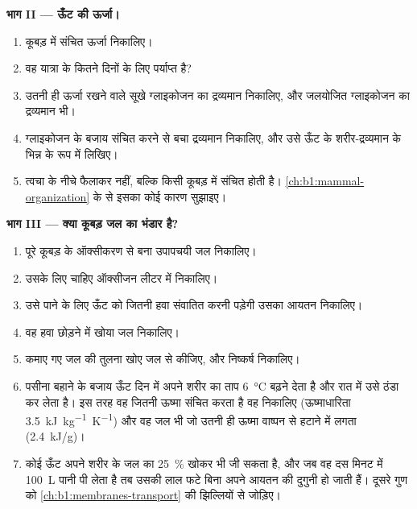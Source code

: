 \begin{problem}
\medskip
\noindent\textbf{भाग II --- ऊँट की ऊर्जा।}
\begin{enumerate}[resume]
  \item कूबड़ में संचित ऊर्जा निकालिए।
  \item वह यात्रा के कितने दिनों के लिए पर्याप्त है?
  \item उतनी ही ऊर्जा रखने वाले सूखे ग्लाइकोजन का द्रव्यमान निकालिए,
        और जलयोजित ग्लाइकोजन का द्रव्यमान भी।
  \item ग्लाइकोजन के बजाय  संचित करने से बचा द्रव्यमान निकालिए, और
        उसे ऊँट के शरीर-द्रव्यमान के भिन्न के रूप में लिखिए।
  \item {} त्वचा के नीचे फैलाकर नहीं, बल्कि किसी कूबड़ में संचित होती
        है। \cref{ch:b1:mammal-organization} के  से इसका कोई
        कारण सुझाइए।
\end{enumerate}

\medskip
\noindent\textbf{भाग III --- क्या कूबड़ जल का भंडार है?}
\begin{enumerate}[resume]
  \item पूरे कूबड़ के ऑक्सीकरण से बना उपापचयी जल निकालिए।
  \item उसके लिए चाहिए ऑक्सीजन लीटर में निकालिए।
  \item उसे पाने के लिए ऊँट को जितनी हवा संवातित करनी पड़ेगी उसका आयतन
        निकालिए।
  \item वह हवा छोड़ने में खोया जल निकालिए।
  \item कमाए गए जल की तुलना खोए जल से कीजिए, और निष्कर्ष निकालिए।
  \item पसीना बहाने के बजाय ऊँट दिन में अपने शरीर का ताप
        \qty{6}{\celsius} बढ़ने देता है और रात में उसे ठंडा कर लेता है।
        इस तरह वह जितनी ऊष्मा संचित करता है वह निकालिए (ऊष्माधारिता
        \qty{3.5}{kJ.kg^{-1}.K^{-1}}) और वह जल भी जो उतनी ही ऊष्मा
        वाष्पन से हटाने में लगता (\qty{2.4}{kJ/g})।
  \item कोई ऊँट अपने शरीर के जल का \qty{25}{\%} खोकर भी जी सकता है, और
        जब वह दस मिनट में \qty{100}{L} पानी पी लेता है तब उसकी लाल
         फटे बिना अपने आयतन की दुगुनी हो जाती हैं। दूसरे गुण को
        \cref{ch:b1:membranes-transport} की झिल्लियों से जोड़िए।
\end{enumerate}


\end{problem}
